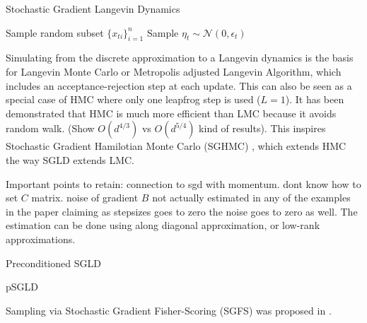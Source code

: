 \documentclass{book}
\begin{document}
\begin{enumerate}
\begin{algorithm}
    \caption{Stochastic Gradient Langevin Dynamics}
    \State Sample random subset $\{x_{ti}\}_{i=1}^n$
    \State Sample $\eta_t \sim \mathcal{N}(0,\epsilon_t) $
    \EndFor
\end{algorithm}
Simulating from the discrete approximation to a Langevin dynamics is the basis
for Langevin Monte Carlo or Metropolis adjusted Langevin Algorithm, which
includes an acceptance-rejection step at each update. This can also be seen as a
special case of HMC where only one leapfrog step is used ($L=1$). It has been
demonstrated that HMC is much more efficient than LMC because it avoids random
walk. (Show $O(d^{4/3})$ vs $O(d^{5/4})$ kind of results). This inspires
Stochastic Gradient Hamilotian Monte Carlo (SGHMC) \cite{chen2014stochastic},
which extends HMC the way SGLD extends LMC. 

\begin{algorithm}
    \caption{Stochastic Gradient HMC}
    \comment{Input: $\eta,\alpha,n,T,m,\theta_0$
        \State{Initialize $\theta_0,v_0$}
        \For{t = 1:T}
        \State{$\theta^{0}=\theta_{t-1}$}
        \State{$v^{0}=v_{t-1}$}
        \For{i = 1:m}
        \State{$\theta^{i} = \theta^{i-1} + v^{i-1}$}
        \State{Sample $z \sim \mathcal{N}(0,2(\alpha-\hat{\beta} \eta)$}
        \State{Sample minibatch and calculate $\nambla \tilde{U}(x)$ }
        \State{$v^{i} = -\eta \nambla \tilde{U}(x) - \alpha v^{i-1} + z$}
        \EndFor
        \State{$\theta_t = \theta^{m}$}
        \State{$\v_t = v^{m}$}
        \EndFor
\end{algorithm}
Important points to retain: connection to sgd with momentum. dont know how to
set $C$ matrix. noise of gradient $B$ not actually estimated in any of the
examples in the paper claiming as stepsizes goes to zero the noise goes to zero
as well. The estimation can be done using along diagonal approximation, or  
low-rank approximations. 

Preconditioned SGLD
\begin{algorithm}
    \caption{pSGLD}
    \EndFor
\end{algorithm}
Sampling via Stochastic Gradient Fisher-Scoring (SGFS) was proposed in
\cite{ahn2012bayesian}.



\end{enumerate}
\end{document}
